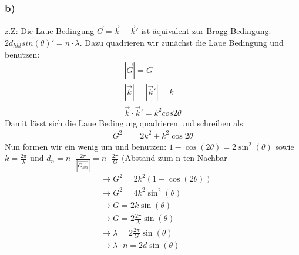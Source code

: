 \documentclass[11pt]{article}
\begin{document}
\subsubsection*{b)}
z.Z: Die Laue Bedingung $\vec{G} = \vec{k}-\vec{k}'$ ist äquivalent zur Bragg Bedingung: $2d_{hkl}sin(\theta)'=n\cdot\lambda$. Dazu quadrieren wir zunächst die Laue Bedingung und benutzen:
\begin{align*}
|\vec{G}| = G\\
|\vec{k}|=|\vec{k}'|=k\\
\vec{k}\cdot\vec{k}' = k^2cos{2\theta}
\end{align*}
Damit lässt sich die Laue Bedingung quadrieren und schreiben als:
\begin{align*}
G^2 &= 2k^2+k^2\cos{2\theta}
\end{align*}
Nun formen wir ein wenig um und benutzen: $1-\cos(2\theta)=2\sin^2(\theta)$ sowie $k = \frac{2\pi}{\lambda}$ und $d_n=n\cdot\frac{2\pi}{|\vec{G_{hkl}}|}=n\cdot\frac{2\pi}{G}$ (Abstand zum n-ten Nachbar
\begin{align*}
&\rightarrow G^2 = 2k^2(1-\cos(2\theta))\\
&\rightarrow G^2 = 4k^2 \sin^2(\theta)\\
&\rightarrow G = 2k \sin(\theta)\\
&\rightarrow G = 2\frac{2\pi}{\lambda}\sin(\theta)\\
&\rightarrow \lambda = 2\frac{2\pi}{G}\sin(\theta)\\
&\rightarrow \lambda \cdot n = 2d\sin(\theta)
\end{align*}
\end{document}
